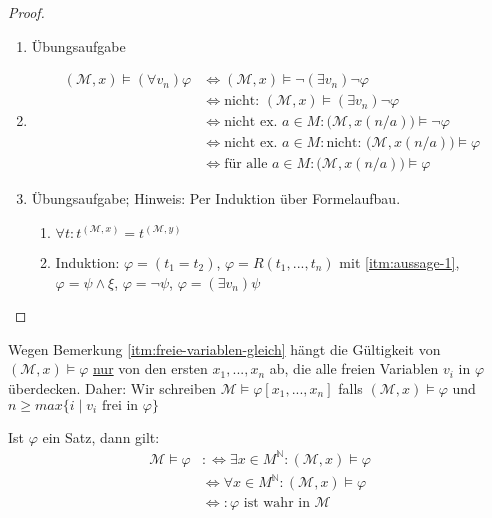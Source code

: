 \documentclass{article}
\theoremstyle{definition}
\theoremstyle{plain}
\newcommand{\calM}{\mathcal{M}}
\begin{document}
    \begin{proof}
        ~\par
        \begin{enumerate}
            \item Übungsaufgabe
            \item \begin{align*}
                (\calM, x) \models (\forall v_n) \varphi & \Leftrightarrow (\calM, x) \models \neg (\exists v_n) \neg \varphi \\
                & \Leftrightarrow \text{nicht: } (\calM, x) \models (\exists v_n) \neg \varphi \\
                & \Leftrightarrow \text{nicht ex. } a \in M: \big(\calM, x(n/a)\big) \models \neg \varphi \\
                & \Leftrightarrow \text{nicht ex. } a \in M: \text{nicht: } \big(\calM, x(n/a)\big) \models \varphi \\
                & \Leftrightarrow \text{für alle } a \in M: \big(\calM, x(n/a)\big) \models \varphi
            \end{align*}
            \item Übungsaufgabe; Hinweis: Per Induktion über Formelaufbau.
            \begin{enumerate}
                \item $ \forall t: t^{(\calM, x)} = t^{(\calM, y)} $ \label{itm:aussage-1}
                \item Induktion: $ \varphi = (t_1 = t_2) $, $ \varphi = R(t_1, ..., t_n) $ mit \ref{itm:aussage-1}, $ \varphi = \psi \land \xi $, $ \varphi = \neg \psi $, $ \varphi = (\exists v_n) \psi $
            \end{enumerate}
        \end{enumerate}
    \end{proof}

    Wegen Bemerkung \ref{itm:freie-variablen-gleich} hängt die Gültigkeit von $ (\calM, x) \models \varphi $ \underline{nur} von den ersten $ x_1, ..., x_n $ ab, die alle freien Variablen $ v_i $ in $ \varphi $ überdecken.
    Daher: Wir schreiben $ \calM \models \varphi[x_1, ..., x_n] $ falls $ (\calM, x) \models \varphi $ und $ n \geq max\{i \mid v_i \text{ frei in } \varphi\} $

    Ist $ \varphi $ ein Satz, dann gilt:
    \begin{align*}
        \calM \models \varphi & :\Leftrightarrow \exists x \in M^{\mathbb{N}}: (\calM, x) \models \varphi \\
        & \Leftrightarrow \forall x \in M^\mathbb{N}: (\calM, x) \models \varphi \\
        & \Leftrightarrow: \varphi \text{ ist wahr in } \calM
    \end{align*}
\end{document}
